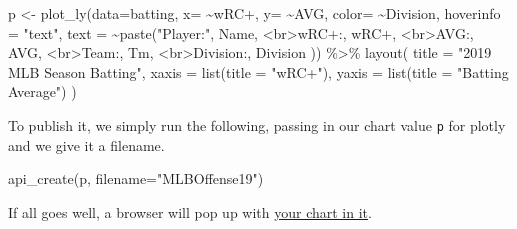 \documentclass[
]{book}
\newenvironment{Shaded}{\begin{snugshade}}{\end{snugshade}}
\newcommand{\AttributeTok}[1]{\textcolor[rgb]{0.77,0.63,0.00}{#1}}
\newcommand{\FunctionTok}[1]{\textcolor[rgb]{0.00,0.00,0.00}{#1}}
\newcommand{\NormalTok}[1]{#1}
\newcommand{\OtherTok}[1]{\textcolor[rgb]{0.56,0.35,0.01}{#1}}
\newcommand{\SpecialCharTok}[1]{\textcolor[rgb]{0.00,0.00,0.00}{#1}}
\newcommand{\StringTok}[1]{\textcolor[rgb]{0.31,0.60,0.02}{#1}}
\begin{document}
\begin{Shaded}
\begin{Highlighting}[]
\NormalTok{p }\OtherTok{\textless{}{-}} \FunctionTok{plot\_ly}\NormalTok{(}\AttributeTok{data=}\NormalTok{batting, }\AttributeTok{x=} \SpecialCharTok{\textasciitilde{}}\StringTok{\textasciigrave{}}\AttributeTok{wRC+}\StringTok{\textasciigrave{}}\NormalTok{, }\AttributeTok{y=} \SpecialCharTok{\textasciitilde{}}\StringTok{\textasciigrave{}}\AttributeTok{AVG}\StringTok{\textasciigrave{}}\NormalTok{, }\AttributeTok{color=} \SpecialCharTok{\textasciitilde{}}\StringTok{\textasciigrave{}}\AttributeTok{Division}\StringTok{\textasciigrave{}}\NormalTok{,}
        \AttributeTok{hoverinfo =} \StringTok{"text"}\NormalTok{,}
        \AttributeTok{text =} \SpecialCharTok{\textasciitilde{}}\FunctionTok{paste}\NormalTok{(}\StringTok{"Player:"}\NormalTok{, Name,}
                      \StringTok{\textquotesingle{}\textless{}br\textgreater{}wRC+:\textquotesingle{}}\NormalTok{, }\StringTok{\textasciigrave{}}\AttributeTok{wRC+}\StringTok{\textasciigrave{}}\NormalTok{,}
                      \StringTok{\textquotesingle{}\textless{}br\textgreater{}AVG:\textquotesingle{}}\NormalTok{, AVG,}
                      \StringTok{\textquotesingle{}\textless{}br\textgreater{}Team:\textquotesingle{}}\NormalTok{, Tm,}
                      \StringTok{\textquotesingle{}\textless{}br\textgreater{}Division:\textquotesingle{}}\NormalTok{, Division}
\NormalTok{                      )) }\SpecialCharTok{\%\textgreater{}\%} 
  \FunctionTok{layout}\NormalTok{(}
    \AttributeTok{title =} \StringTok{"2019 MLB Season Batting"}\NormalTok{,}
    \AttributeTok{xaxis =} \FunctionTok{list}\NormalTok{(}\AttributeTok{title =} \StringTok{"wRC+"}\NormalTok{),}
    \AttributeTok{yaxis =} \FunctionTok{list}\NormalTok{(}\AttributeTok{title =} \StringTok{"Batting Average"}\NormalTok{)}
\NormalTok{  )}
\end{Highlighting}
\end{Shaded}

To publish it, we simply run the following, passing in our chart value \texttt{p} for plotly and we give it a filename.

\begin{Shaded}
\begin{Highlighting}[]
\FunctionTok{api\_create}\NormalTok{(p, }\AttributeTok{filename=}\StringTok{"MLBOffense19"}\NormalTok{)}
\end{Highlighting}
\end{Shaded}

If all goes well, a browser will pop up with \href{https://plot.ly/~mattwaite/1/\#/}{your chart in it}.
\end{document}
